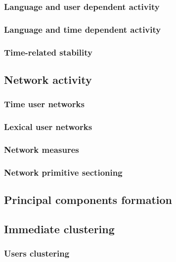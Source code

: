 \documentclass[a4paper, 11pt]{article} %
\begin{document}
\subsubsection{Language and user dependent activity}
\subsubsection{Language and time dependent activity}
\subsubsection{Time-related stability}
\subsection{Network activity}
\subsubsection{Time user networks}

\subsubsection{Lexical user networks}

\subsubsection{Network measures}

\subsubsection{Network primitive sectioning}

\subsection{Principal components formation}
\subsection{Immediate clustering}
\subsubsection{Users clustering}
\end{document}
